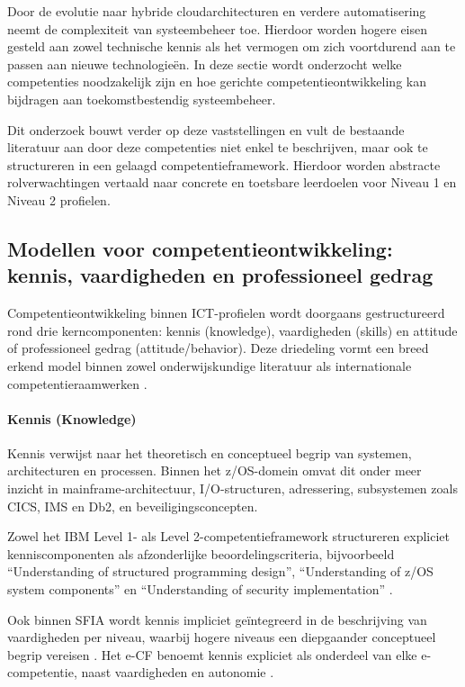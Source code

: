 Door de evolutie naar hybride cloudarchitecturen en verdere automatisering neemt de complexiteit van systeembeheer toe. Hierdoor worden hogere eisen gesteld aan zowel technische kennis als het vermogen om zich voortdurend aan te passen aan nieuwe technologieën. In deze sectie wordt onderzocht welke competenties noodzakelijk zijn en hoe gerichte competentieontwikkeling kan bijdragen aan toekomstbestendig systeembeheer.

Dit onderzoek bouwt verder op deze vaststellingen en vult de bestaande literatuur aan door deze competenties niet enkel te beschrijven, maar ook te structureren in een gelaagd competentieframework. Hierdoor worden abstracte rolverwachtingen vertaald naar concrete en toetsbare leerdoelen voor Niveau 1 en Niveau 2 profielen.

\subsection{Modellen voor competentieontwikkeling: kennis, vaardigheden en professioneel gedrag}
\label{sec:ksa-modellen}

Competentieontwikkeling binnen ICT-profielen wordt doorgaans gestructureerd rond drie kerncomponenten: kennis (knowledge), vaardigheden (skills) en attitude of professioneel gedrag (attitude/behavior). Deze driedeling vormt een breed erkend model binnen zowel onderwijskundige literatuur als internationale competentieraamwerken \autocite{mulder2014competence}.

\paragraph{Kennis (Knowledge)}

Kennis verwijst naar het theoretisch en conceptueel begrip van systemen, architecturen en processen. Binnen het z/OS-domein omvat dit onder meer inzicht in mainframe-architectuur, I/O-structuren, adressering, subsystemen zoals CICS, IMS en Db2, en beveiligingsconcepten.

Zowel het IBM Level 1- als Level 2-competentieframework structureren expliciet kenniscomponenten als afzonderlijke beoordelingscriteria, bijvoorbeeld “Understanding of structured programming design”, “Understanding of z/OS system components” en “Understanding of security implementation” \autocite{ibm_level1_framework,ibm_level2_framework}.  

Ook binnen SFIA wordt kennis impliciet geïntegreerd in de beschrijving van vaardigheden per niveau, waarbij hogere niveaus een diepgaander conceptueel begrip vereisen \autocite{sfia_framework}. Het e-CF benoemt kennis expliciet als onderdeel van elke e-competentie, naast vaardigheden en autonomie \autocite{eCF_framework}.

